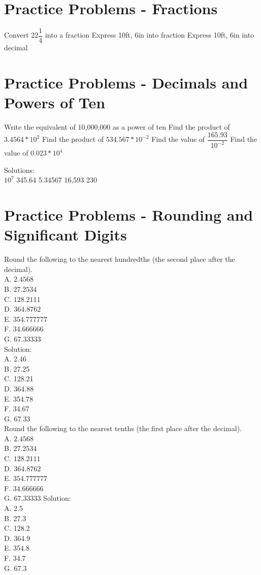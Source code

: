 \section*{Practice Problems - Fractions}

Convert 22$\dfrac{1}{4}$ into a fraction
Express 10ft, 6in into fraction
Express 10ft, 6in into decimal


\vspace{1cm}
\section*{Practice Problems - Decimals and Powers of Ten}

Write the equivalent of 10,000,000 as a power of ten
Find the product of $3.4564*10^2$
Find the product of $534.567*10^{-2}$
\vspace{0.2cm}
Find the value of $\dfrac{165.93}{10^{-2}}$
\vspace{0.2cm}
Find the value of $0.023*10^4$

\vspace{1cm}
Solutions:\\

$10^7$
345.64
5.34567
16,593
230

\section*{Practice Problems - Rounding and Significant Digits}
Round the following to the nearest hundredths (the second place after the decimal).\\
A. $2.4568$\\
B. $27.2534$\\
C. $128.2111$\\
D. $364.8762$\\
E. $354.777777$\\
F. $34.666666$\\
G. $67.33333$\\
\vspace{0.5cm}
Solution:\\
A. 2.46\\
B. 27.25\\
C. 128.21\\
D. 364.88\\
E. 354.78\\
F. 34.67\\
G. 67.33\\
Round the following to the nearest tenths (the first place after the decimal).\\
A. $2.4568$\\
B. $27.2534$\\
C. $128.2111$\\
D. $364.8762$\\
E. $354.777777$\\
F. $34.666666$\\
G. $67.33333$
Solution:\\
A. 2.5\\
B. 27.3\\
C. 128.2\\
D. 364.9\\
E. 354.8\\
F. 34.7\\
G. 67.3

